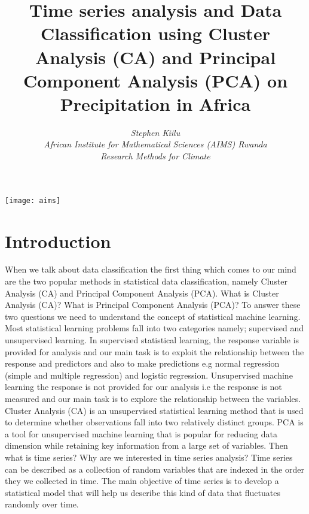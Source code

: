 \documentclass[12pt,a4paper]{article}
\title{\Large{\textbf{Time series analysis and Data Classification using Cluster Analysis (CA) and Principal Component Analysis (PCA) on Precipitation in Africa}}}
\author{ \em Stephen Kiilu\\
\em African Institute for Mathematical Sciences (AIMS) Rwanda\\
 \em Research Methods for Climate}
\date{}
\begin{document}
\maketitle
\vspace{12cm}
\begin{center}
\texttt{[image: aims]}
\end{center}



\newpage
\begin{centering}
{\color {red} \tableofcontents}
\newpage
\end{centering}
\section{Introduction}
When we talk about data classification the first thing which comes to our mind are the two popular methods in statistical data classification, namely Cluster Analysis (CA) and Principal Component Analysis (PCA). What is Cluster Analysis (CA)? What is Principal Component Analysis (PCA)? To answer these two questions we need to understand the concept of statistical machine learning. Most statistical learning problems fall into two categories namely; supervised and unsupervised learning. In supervised statistical learning, the response variable is provided for analysis and our main task is to exploit the relationship between the response and predictors and also to make predictions e.g normal regression (simple and multiple regression) and logistic regression. Unsupervised machine learning the response is not provided for our analysis i.e the response is not measured and our main task is to explore the relationship between the variables. Cluster Analysis (CA) is an unsupervised statistical learning method that is used to determine whether observations fall into two relatively distinct groups. PCA is a tool for unsupervised machine learning that is popular for reducing data dimension while retaining key information from a large set of variables.
Then what is time series? Why are we interested in time series analysis? Time series can be described as a collection of random variables that are indexed in the order they we collected in time. The main objective of time series is to develop a statistical model that will help us describe this kind of data that fluctuates randomly over time.
\end{document}
